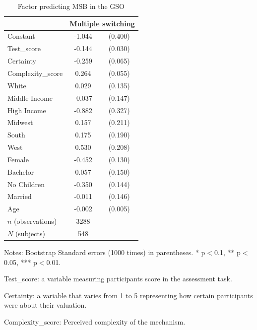 \documentclass[12pt]{article}
\newcommand{\sym}[1]{\rlap{$^{#1}$}}
\begin{document}
\begin{table}[H]
        \centering
        \caption{Factor predicting MSB  in the GSO}    
        \label{tab:MSB_predictor1}
      \begin{tabular}{l*{1}{cc}}
      \hline \hline
            &\multicolumn{2}{c}{Multiple switching}    \\
            \hline
Constant    &      -1.044\sym{***}&     (0.400)\\
Test\_score  &      -0.144\sym{***}&     (0.030)\\
Certainty     &      -0.259\sym{***}&     (0.065)\\
Complexity\_score&       0.264\sym{***}&     (0.055)\\
White       &       0.029         &     (0.135)\\
Middle Income&      -0.037         &     (0.147)\\
High Income &      -0.882\sym{***}&     (0.327)\\
Midwest     &       0.157         &     (0.211)\\
South       &       0.175         &     (0.190)\\
West        &       0.530\sym{**} &     (0.208)\\
Female      &      -0.452\sym{***}&     (0.130)\\
Bachelor    &       0.057         &     (0.150)\\
No Children &      -0.350\sym{**} &     (0.144)\\
Married     &      -0.011         &     (0.146)\\
Age         &      -0.002         &     (0.005)\\
\hline
\(n\) (observations)      &        3288         &            \\
\(N\) (subjects)       &        548         &            \\
\hline \hline
\end{tabular}

\begin{tablenotes}
            \footnotesize
         \item Notes: Bootstrap Standard errors (1000 times) in parentheses. * p$<$0.1, ** p$<$0.05, *** p$<$0.01.
         \item Test\_score: a variable measuring participants score in the assessment task.
            \item  Certainty: a variable that varies from 1 to 5 representing how certain participants were about their valuation.
            \item Complexity\_score: Perceived complexity of the mechanism.
        \end{tablenotes}
\end{table}
\end{document}
